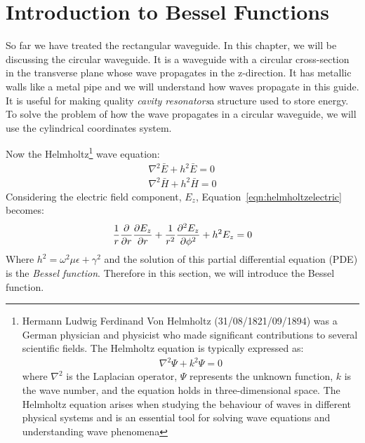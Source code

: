 \chapter{Introduction to Bessel Functions}\label{lec:lec43}
So far we have treated the rectangular waveguide. In this chapter, we will be discussing the circular waveguide. It is a waveguide with a circular cross-section in the transverse plane whose wave propagates in the z-direction. It has metallic walls like a metal pipe and we will understand how waves propagate in this guide. It is useful for making quality \emph{cavity resonators}\textemdash\;a structure used to store energy. To solve the problem of how the wave propagates in a circular waveguide, we will use the cylindrical coordinates system.

Now the Helmholtz\footnote{
Hermann Ludwig Ferdinand Von Helmholtz (31/08/1821/09/1894) was a German physician and physicist who made significant contributions to several scientific fields.  The Helmholtz equation is typically expressed as:
\begin{align*}    
\nabla^2\Psi + k^2\Psi = 0
\end{align*}
where $\nabla^2$ is the Laplacian operator, $\Psi$ represents the unknown function, $k$ is the wave number, and the equation holds in three-dimensional space. The Helmholtz equation arises when studying the behaviour of waves in different physical systems and is an essential tool for solving wave equations and understanding wave phenomena
} wave equation:
\begin{align}
\nabla^2 \bar{E} + h^2 \bar{E} = 0\label{eqn:helmholtzelectric}\\
\nabla^2 \bar{H} + h^2 \bar{H} = 0\label{eqn:helmholtzmagnetic}
\end{align}
Considering the electric field component, $E_z$, Equation~\eqref{eqn:helmholtzelectric} becomes:
\begin{align*}
\frac{1}{r} \partialderivative{}{r}\partialderivative{E_z}{r} + \frac{1}{r^2} \partialderivative[2]{E_z}{\phi} + h^2 E_z = 0
\end{align*}
Where $h^2 = \omega^2 \mu \epsilon + \gamma^2$ and the solution of this partial differential equation (PDE) is the \emph{Bessel function}. Therefore in this section, we will introduce the Bessel function.

